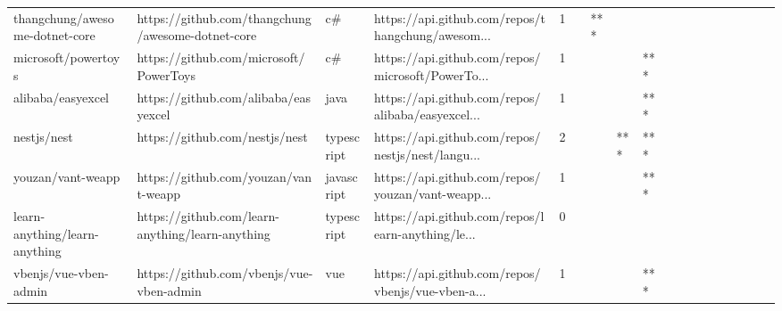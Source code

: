 \begin{tabular}{llllrlllllllllllll}
thangchung/awesome-dotnet-core                     &  https://github.com/thangchung/awesome-dotnet-core &                c\# &  https://api.github.com/repos/thangchung/awesom... &       1 &         &    *** &           &                &                 &        &           &           &          &          &       &              &          \\
microsoft/powertoys                                &             https://github.com/microsoft/PowerToys &                c\# &  https://api.github.com/repos/microsoft/PowerTo... &       1 &         &        &           &            *** &                 &        &           &           &          &          &       &              &          \\
alibaba/easyexcel                                  &               https://github.com/alibaba/easyexcel &              java &  https://api.github.com/repos/alibaba/easyexcel... &       1 &         &        &           &            *** &                 &        &           &           &          &          &       &              &          \\
nestjs/nest                                        &                     https://github.com/nestjs/nest &        typescript &  https://api.github.com/repos/nestjs/nest/langu... &       2 &         &        &       *** &            *** &                 &        &           &           &          &          &       &              &          \\
youzan/vant-weapp                                  &               https://github.com/youzan/vant-weapp &        javascript &  https://api.github.com/repos/youzan/vant-weapp... &       1 &         &        &           &            *** &                 &        &           &           &          &          &       &              &          \\
learn-anything/learn-anything                      &   https://github.com/learn-anything/learn-anything &        typescript &  https://api.github.com/repos/learn-anything/le... &       0 &         &        &           &                &                 &        &           &           &          &          &       &              &          \\
vbenjs/vue-vben-admin                              &           https://github.com/vbenjs/vue-vben-admin &               vue &  https://api.github.com/repos/vbenjs/vue-vben-a... &       1 &         &        &           &            *** &                 &        &           &           &          &          &       &              &          \\

\end{tabular}
